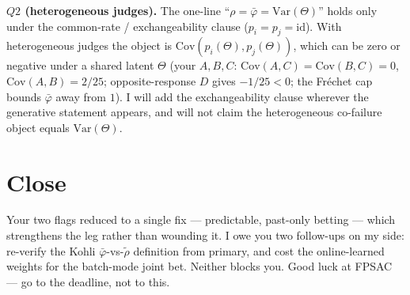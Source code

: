 \documentclass[11pt]{article}
\begin{document}
\textbf{$Q2$ (heterogeneous judges).} The one-line ``$\rho=\bar\varphi=\mathrm{Var}(\Theta)$'' holds only under the common-rate / exchangeability clause ($p_i=p_j=\mathrm{id}$). With heterogeneous judges the object is $\mathrm{Cov}(p_i(\Theta),p_j(\Theta))$, which can be zero or negative under a shared latent $\Theta$ (your $A,B,C$: $\mathrm{Cov}(A,C)=\mathrm{Cov}(B,C)=0$, $\mathrm{Cov}(A,B)={2}/{25}$; opposite-response $D$ gives $-{1}/{25}<0$; the Fr\'echet cap bounds $\bar\varphi$ away from $1$). I will add the exchangeability clause wherever the generative statement appears, and will not claim the heterogeneous co-failure object equals $\mathrm{Var}(\Theta)$.

\section*{Close}
Your two flags reduced to a single fix --- predictable, past-only betting --- which strengthens the leg rather than wounding it. I owe you two follow-ups on my side: re-verify the Kohli $\bar\varphi$-vs-$\tilde\rho$ definition from primary, and cost the online-learned weights for the batch-mode joint bet. Neither blocks you. Good luck at FPSAC --- go to the deadline, not to this.
\end{document}
